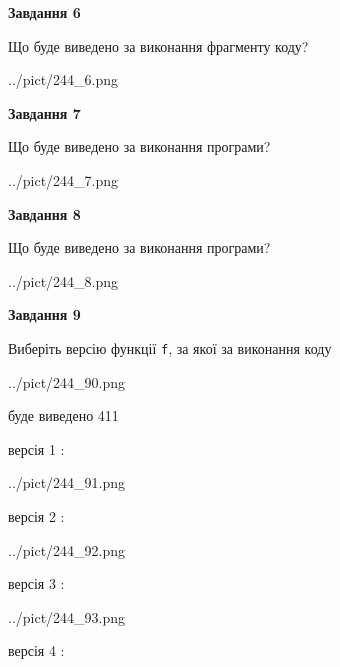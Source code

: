 \documentclass[12pt, ukrainian]{article}
\def\code#1{\Verb!#1!}
\begin{document}
{\begin {large}
{\begin {center}\textbf{Завдання 6}\end {center}}

Що буде виведено за виконання фрагменту коду?\par
\begin{center}
	{../pict/244_6.png}
\end{center}
\newpage

{\begin {center}\textbf{Завдання 7}\end {center}}

Що буде виведено за виконання програми?\par
\begin{center}
	{../pict/244_7.png}
\end{center}
\newpage

{\begin {center}\textbf{Завдання 8}\end {center}}

Що буде виведено за виконання програми?\par
\begin{center}
	{../pict/244_8.png}
\end{center}
\newpage

{\begin {center}\textbf{Завдання 9}\end {center}}

Виберіть версію функції \code{f}, за якої за виконання коду
\begin{center}
	{../pict/244_90.png}
\end{center}
буде виведено 411

\vspace{5mm}
версія 1 :

\begin{center}
	{../pict/244_91.png}
\end{center}
версія 2 :

\begin{center}
	{../pict/244_92.png}
\end{center}
версія 3 :

\begin{center}
	{../pict/244_93.png}
\end{center}
версія 4 :


\end{large}}
\end{document}
